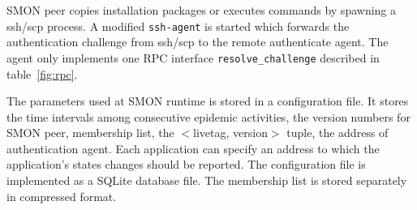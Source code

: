 SMON peer copies installation packages or executes commands
by spawning a ssh/scp process. A modified \texttt{ssh-agent}
is started which forwards the authentication challenge from
ssh/scp to the remote authenticate agent. The agent only
implements one RPC interface \texttt{resolve\_challenge}
described in table~\ref{fig:rpc}.

The parameters used at SMON runtime is stored in a
configuration file. It stores the time intervals among
consecutive epidemic activities, the version numbers for
SMON peer, membership list, the $<$livetag, version$>$
tuple, the address of authentication agent. Each application
can specify an address to which the application's states
changes should be reported. The configuration file is
implemented as a SQLite database file.  The membership list
is stored separately in compressed format.



